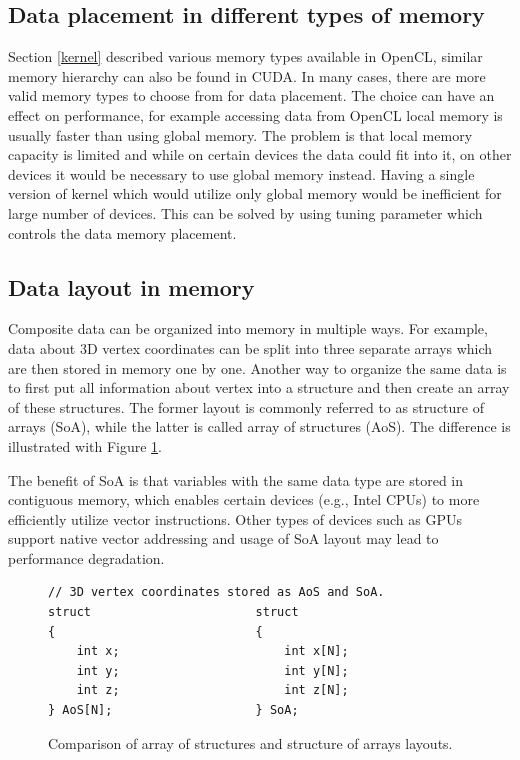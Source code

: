 \documentclass
[
    digital, %
    oneside, %
    table, %
    nolof, %
    nolot, %
    nocover %
]{fithesis3}
\begin{document}
\subsection{Data placement in different types of memory}
Section \ref{kernel} described various memory types available in OpenCL, similar memory hierarchy can also be found in CUDA. In many cases, there are
more valid memory types to choose from for data placement. The choice can have an effect on performance, for example accessing data from OpenCL local
memory is usually faster than using global memory. The problem is that local memory capacity is limited and while on certain devices the data could
fit into it, on other devices it would be necessary to use global memory instead. Having a single version of kernel which would utilize only global
memory would be inefficient for large number of devices. This can be solved by using tuning parameter which controls the data memory placement.

\subsection{Data layout in memory}
Composite data can be organized into memory in multiple ways. For example, data about 3D vertex coordinates can be split into three separate arrays
which are then stored in memory one by one. Another way to organize the same data is to first put all information about vertex into a structure and
then create an array of these structures. The former layout is commonly referred to as structure of arrays (SoA), while the latter is called array
of structures (AoS). The difference is illustrated with Figure \ref{aos_soa}.

The benefit of SoA is that variables with the same data type are stored in contiguous memory, which enables certain devices (e.g., Intel CPUs) to more
efficiently utilize vector instructions. Other types of devices such as GPUs support native vector addressing and usage of SoA layout may lead to
performance degradation.

\begin{figure}
\begin{lstlisting}
// 3D vertex coordinates stored as AoS and SoA.
struct                       struct
{                            {
    int x;                       int x[N];
    int y;                       int y[N];
    int z;                       int z[N];
} AoS[N];                    } SoA;
\end{lstlisting}
\caption{Comparison of array of structures and structure of arrays layouts.}
\label{aos_soa}
\end{figure}
\end{document}
